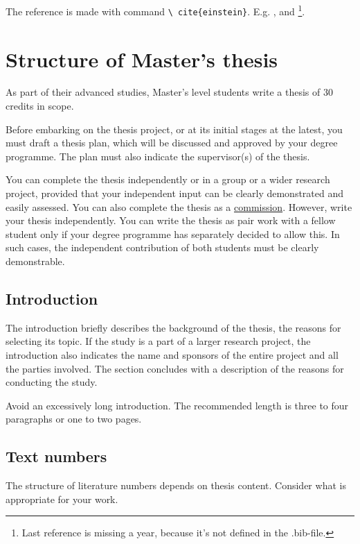 \documentclass[english,twoside,openright]{HYgradu}
\begin{document}
The reference is made with command \texttt{\textbackslash
  cite\{einstein\}}. E.g.  \cite{einstein}, \cite{latexcompanion} and
\cite{knuthwebsite}\footnote{Last reference is missing a year, because
  it's not defined in the .bib-file.}.

\chapter{Structure of Master's thesis}

As part of their advanced studies, Master's level students write a
thesis of 30 credits in scope.

Before embarking on the thesis project, or at its initial stages at
the latest, you must draft a thesis plan, which will be discussed and
approved by your degree programme. The plan must also indicate the
supervisor(s) of the thesis.

You can complete the thesis independently or in a group or a wider
research project, provided that your independent input can be clearly
demonstrated and easily assessed. You can also complete the thesis as
a
\href{https://guide.student.helsinki.fi/en/article/masters-thesis-commissions}{commission}. However,
write your thesis independently. You can write the thesis as pair work
with a fellow student only if your degree programme has separately
decided to allow this. In such cases, the independent contribution of
both students must be clearly demonstrable.

\section{Introduction}

The introduction briefly describes the background of the thesis, the
reasons for selecting its topic. If the study is a part of a larger
research project, the introduction also indicates the name and
sponsors of the entire project and all the parties involved. The
section concludes with a description of the reasons for conducting the
study.

Avoid an excessively long introduction. The recommended length is
three to four paragraphs or one to two pages.

\section{Text numbers}

The structure of literature numbers depends on thesis
content. Consider what is appropriate for your work.
\end{document}
